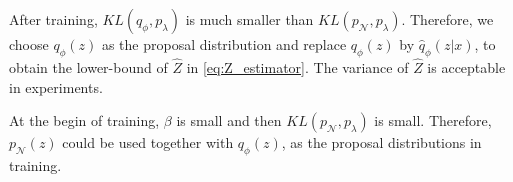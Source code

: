 After training, $KL(q_\phi, p_\lambda)$ is much smaller than $KL(p_\mathcal{N}, p_\lambda)$. Therefore, we choose $q_\phi(z)$ as the proposal distribution and replace $q_\phi(z)$ by $\hat{q}_\phi(z|x)$, to obtain the lower-bound of $\hat{Z}$ in \cref{eq:Z_estimator}. The variance of $\hat{Z}$ is acceptable in experiments.  

At the begin of training, $\beta$ is small and then $KL(p_\mathcal{N}, p_\lambda)$ is small. Therefore, $p_\mathcal{N}(z)$ could be used together with $q_\phi(z)$, as the proposal distributions in training.
 